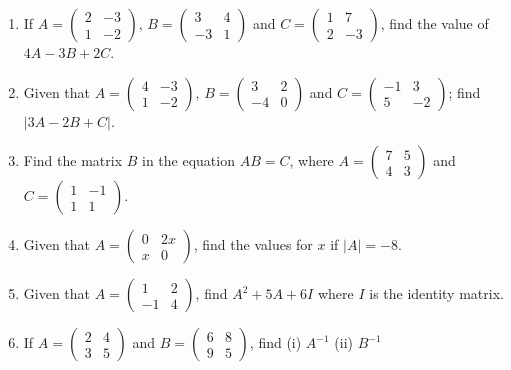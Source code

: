 \begin{enumerate}
	\item If $A = 
	\begin{pmatrix}
	2 & -3 \\
	1 & -2
	\end{pmatrix}$,
	$B = 
	\begin{pmatrix}
	3 & 4 \\
	-3 & 1
	\end{pmatrix}$ and
	$C = 
	\begin{pmatrix}
	1 & 7 \\
	2 & -3
	\end{pmatrix}$, find the value of $4A - 3B + 2C$.
	
	\item Given that $A = 
	\begin{pmatrix}
	4 & -3 \\
	1 & -2
	\end{pmatrix}$,
	$B = 
	\begin{pmatrix}
	3 & 2 \\
	-4 & 0
	\end{pmatrix}$ and
	$C = 
	\begin{pmatrix}
	-1 & 3 \\
	5 & -2
	\end{pmatrix}$; find $|3A - 2B + C|$.
	
	\item Find the matrix $B$ in the equation $AB = C$, where $A = 
	\begin{pmatrix}
	7 & 5 \\
	4 & 3
	\end{pmatrix}$ and
	$C = 
	\begin{pmatrix}
	1 & -1 \\
	1 & 1
	\end{pmatrix}$.
	
	\item Given that $A = 
	\begin{pmatrix}
	0 & 2x \\
	x & 0
	\end{pmatrix}$, find the values for $x$ if $|A| = -8$.
	
	\item Given that $A = 
	\begin{pmatrix}
	1 & 2 \\
	-1 & 4
	\end{pmatrix}$, find $A^2 + 5A + 6I$ where $I$ is the identity matrix.
	
	\item If $A = 
	\begin{pmatrix}
	2 & 4 \\
	3 & 5
	\end{pmatrix}$ and 
	$B = 
	\begin{pmatrix}
	6 & 8 \\
	9 & 5
	\end{pmatrix}$, find (i) $A^{-1}$ \quad (ii) $B^{-1}$
	

\end{enumerate}
